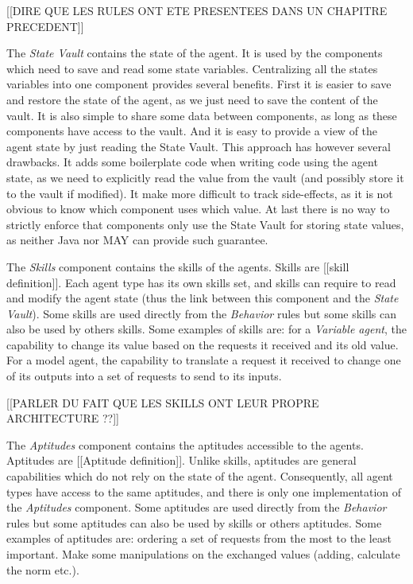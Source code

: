 [[DIRE QUE LES RULES ONT ETE PRESENTEES DANS UN CHAPITRE PRECEDENT]]

The \emph{State Vault} contains the state of the agent. It is used by the components which need to save and read some state variables. Centralizing all the states variables into one component provides several benefits. First it is easier to save and restore the state of the agent, as we just need to save the content of the vault. It is also simple to share some data between components, as long as these components have access to the vault. And it is easy to provide a view of the agent state by just reading the State Vault.
This approach has however several drawbacks. It adds some boilerplate code when writing code using the agent state, as we need to explicitly read the value from the vault (and possibly store it to the vault if modified). It make more difficult to track side-effects, as it is not obvious to know which component uses which value. At last there is no way to strictly enforce that components only use the State Vault for storing state values, as neither Java nor MAY can provide such guarantee.

The \emph{Skills} component contains the skills of the agents. Skills are [[skill definition]]. Each agent type has its own skills set, and skills can require to read and modify the agent state (thus the link between this component and the \emph{State Vault}).
Some skills are used directly from the \emph{Behavior} rules but some skills can also be used by others skills.
Some examples of skills are: for a \emph{Variable agent}, the capability to change its value based on the requests it received and its old value. For a model agent, the capability to translate a request it received to change one of its outputs into a set of requests to send to its inputs.

[[PARLER DU FAIT QUE LES SKILLS ONT LEUR PROPRE ARCHITECTURE ??]]

The \emph{Aptitudes} component contains the aptitudes accessible to the agents. Aptitudes are [[Aptitude definition]]. Unlike skills, aptitudes are general capabilities which do not rely on the state of the agent. Consequently, all agent types have access to the same aptitudes, and there is only one implementation of the \emph{Aptitudes} component.
Some aptitudes are used directly from the \emph{Behavior} rules but some aptitudes can also be used by skills or others aptitudes.
Some examples of aptitudes are: ordering a set of requests from the most to the least important. Make some manipulations on the exchanged values (adding, calculate the norm etc.).

